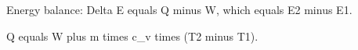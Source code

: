 Energy balance: Delta E equals Q minus W, which equals E2 minus E1.

Q equals W plus m times c_v times (T2 minus T1).